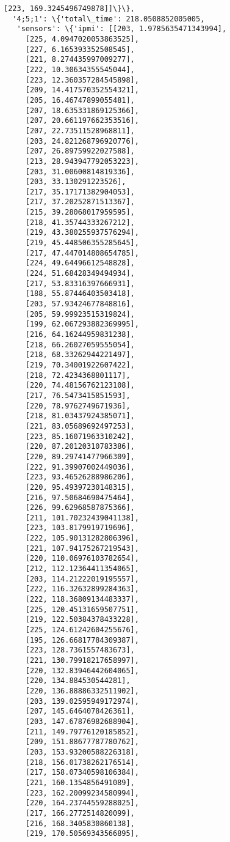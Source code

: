 \documentclass[11pt]{article}
\begin{document}
\begin{tcolorbox}[breakable, size=fbox, boxrule=.5pt, pad at break*=1mm, opacityfill=0]
\begin{Verbatim}[commandchars=\\\{\}]
     [223, 169.3245496749878]]\}\},
  '4;5;1': \{'total\_time': 218.0508852005005,
   'sensors': \{'ipmi': [[203, 1.9785635471343994],
     [225, 4.0947020053863525],
     [227, 6.165393352508545],
     [221, 8.274435997009277],
     [222, 10.30634355545044],
     [223, 12.360357284545898],
     [209, 14.417570352554321],
     [205, 16.46747899055481],
     [207, 18.635331869125366],
     [207, 20.661197662353516],
     [207, 22.73511528968811],
     [203, 24.821268796920776],
     [207, 26.89759922027588],
     [213, 28.943947792053223],
     [203, 31.00600814819336],
     [203, 33.130291223526],
     [217, 35.17171382904053],
     [217, 37.20252871513367],
     [215, 39.28068017959595],
     [218, 41.35744333267212],
     [219, 43.380255937576294],
     [219, 45.448506355285645],
     [217, 47.447014808654785],
     [224, 49.64496612548828],
     [224, 51.68428349494934],
     [217, 53.83316397666931],
     [188, 55.87446403503418],
     [203, 57.93424677848816],
     [205, 59.99923515319824],
     [199, 62.067293882369995],
     [216, 64.16244959831238],
     [218, 66.26027059555054],
     [218, 68.33262944221497],
     [219, 70.34001922607422],
     [218, 72.4234368801117],
     [220, 74.48156762123108],
     [217, 76.5473415851593],
     [220, 78.9762749671936],
     [218, 81.03437924385071],
     [221, 83.05689692497253],
     [223, 85.16071963310242],
     [220, 87.20120310783386],
     [220, 89.29741477966309],
     [222, 91.39907002449036],
     [223, 93.46526288986206],
     [220, 95.49397230148315],
     [216, 97.50684690475464],
     [226, 99.62968587875366],
     [211, 101.70232439041138],
     [223, 103.8179919719696],
     [222, 105.90131282806396],
     [221, 107.94175267219543],
     [220, 110.06976103782654],
     [212, 112.12364411354065],
     [203, 114.21222019195557],
     [222, 116.32632899284363],
     [222, 118.36809134483337],
     [225, 120.45131659507751],
     [219, 122.50384378433228],
     [225, 124.61242604255676],
     [195, 126.66817784309387],
     [223, 128.7361557483673],
     [221, 130.79918217658997],
     [220, 132.83946442604065],
     [220, 134.884530544281],
     [220, 136.88886332511902],
     [203, 139.02595949172974],
     [207, 145.6464078426361],
     [203, 147.67876982688904],
     [211, 149.79776120185852],
     [209, 151.88677787780762],
     [203, 153.93200588226318],
     [218, 156.01738262176514],
     [217, 158.07340598106384],
     [221, 160.1354856491089],
     [223, 162.20099234580994],
     [220, 164.23744559288025],
     [217, 166.2772514820099],
     [216, 168.3405830860138],
     [219, 170.50569343566895],

\end{Verbatim}
\end{tcolorbox}
\end{document}
